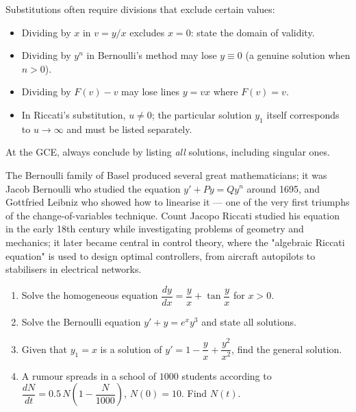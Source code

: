 \documentclass[11pt]{article}
\begin{document}
\begin{attention}
Substitutions often require divisions that exclude certain values:
\begin{itemize}
\item Dividing by $x$ in $v = y/x$ excludes $x = 0$: state the domain of validity.
\item Dividing by $y^n$ in Bernoulli's method may lose $y \equiv 0$ (a genuine solution when $n > 0$).
\item Dividing by $F(v) - v$ may lose lines $y = vx$ where $F(v) = v$.
\item In Riccati's substitution, $u \neq 0$; the particular solution $y_1$ itself corresponds to $u \to \infty$ and must be listed separately.
\end{itemize}
At the GCE, always conclude by listing \emph{all} solutions, including singular ones.
\end{attention}

\begin{savaistu}
The Bernoulli family of Basel produced several great mathematicians; it was Jacob Bernoulli who studied the equation $y' + P y = Q y^n$ around 1695, and Gottfried Leibniz who showed how to linearise it — one of the very first triumphs of the change-of-variables technique. Count Jacopo Riccati studied his equation in the early 18th century while investigating problems of geometry and mechanics; it later became central in control theory, where the "algebraic Riccati equation" is used to design optimal controllers, from aircraft autopilots to stabilisers in electrical networks.
\end{savaistu}

\begin{exercice}
\begin{enumerate}
\item Solve the homogeneous equation $\dfrac{dy}{dx} = \dfrac{y}{x} + \tan\!\dfrac{y}{x}$ for $x > 0$.
\item Solve the Bernoulli equation $y' + y = e^x y^3$ and state all solutions.
\item Given that $y_1 = x$ is a solution of $y' = 1 - \dfrac{y}{x} + \dfrac{y^2}{x^2}$, find the general solution.
\item A rumour spreads in a school of $1000$ students according to $\dfrac{dN}{dt} = 0.5\,N\left(1 - \dfrac{N}{1000}\right)$, $N(0) = 10$. Find $N(t)$.
\end{enumerate}
\end{exercice}
\end{document}
